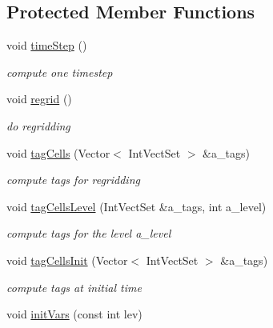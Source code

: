 \subsection*{Protected Member Functions}
\begin{DoxyCompactItemize}
\item 
void \hyperlink{classamr_mushy_layer_abf8a2ced1a62c3bf413494827c043a5d}{time\-Step} ()
\begin{DoxyCompactList}\small\item\em compute one timestep \end{DoxyCompactList}\item 
\hypertarget{classamr_mushy_layer_a84651402cfdf12a589571326ba3d76b0}{void \hyperlink{classamr_mushy_layer_a84651402cfdf12a589571326ba3d76b0}{regrid} ()}\label{classamr_mushy_layer_a84651402cfdf12a589571326ba3d76b0}

\begin{DoxyCompactList}\small\item\em do regridding \end{DoxyCompactList}\item 
\hypertarget{classamr_mushy_layer_ab4506f0846d5f996510308bac8bbc988}{void \hyperlink{classamr_mushy_layer_ab4506f0846d5f996510308bac8bbc988}{tag\-Cells} (Vector$<$ Int\-Vect\-Set $>$ \&a\-\_\-tags)}\label{classamr_mushy_layer_ab4506f0846d5f996510308bac8bbc988}

\begin{DoxyCompactList}\small\item\em compute tags for regridding \end{DoxyCompactList}\item 
\hypertarget{classamr_mushy_layer_a58f515311979c3fbb70d173c9a41b2b1}{void \hyperlink{classamr_mushy_layer_a58f515311979c3fbb70d173c9a41b2b1}{tag\-Cells\-Level} (Int\-Vect\-Set \&a\-\_\-tags, int a\-\_\-level)}\label{classamr_mushy_layer_a58f515311979c3fbb70d173c9a41b2b1}

\begin{DoxyCompactList}\small\item\em compute tags for the level a\-\_\-level \end{DoxyCompactList}\item 
\hypertarget{classamr_mushy_layer_addb6e9526d99bb162454080ebbc68c32}{void \hyperlink{classamr_mushy_layer_addb6e9526d99bb162454080ebbc68c32}{tag\-Cells\-Init} (Vector$<$ Int\-Vect\-Set $>$ \&a\-\_\-tags)}\label{classamr_mushy_layer_addb6e9526d99bb162454080ebbc68c32}

\begin{DoxyCompactList}\small\item\em compute tags at initial time \end{DoxyCompactList}\item 
\hypertarget{classamr_mushy_layer_a1596613735e6de7faa78dcc327267336}{void \hyperlink{classamr_mushy_layer_a1596613735e6de7faa78dcc327267336}{init\-Vars} (const int lev)}\label{classamr_mushy_layer_a1596613735e6de7faa78dcc327267336}


\end{DoxyCompactItemize}
